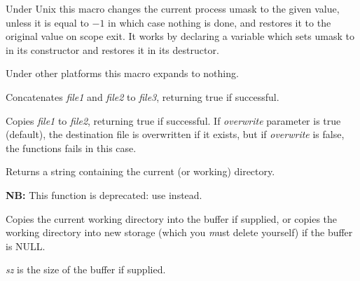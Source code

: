 
Under Unix this macro changes the current process umask to the given value,
unless it is equal to $-1$ in which case nothing is done, and restores it to
the original value on scope exit. It works by declaring a variable which sets
umask to  in its constructor and restores it in its destructor.

Under other platforms this macro expands to nothing.


\label{wxconcatfiles}


Concatenates {\it file1} and {\it file2} to {\it file3}, returning
true if successful.


\label{wxcopyfile}


Copies {\it file1} to {\it file2}, returning true if successful. If
{\it overwrite} parameter is true (default), the destination file is overwritten
if it exists, but if {\it overwrite} is false, the functions fails in this
case.


\label{wxgetcwd}


Returns a string containing the current (or working) directory.


\label{wxgetworkingdirectory}


{\bf NB:} This function is deprecated: use  instead.

Copies the current working directory into the buffer if supplied, or
copies the working directory into new storage (which you {\emph must} delete
yourself) if the buffer is NULL.

{\it sz} is the size of the buffer if supplied.


\label{wxgettempfilename}


